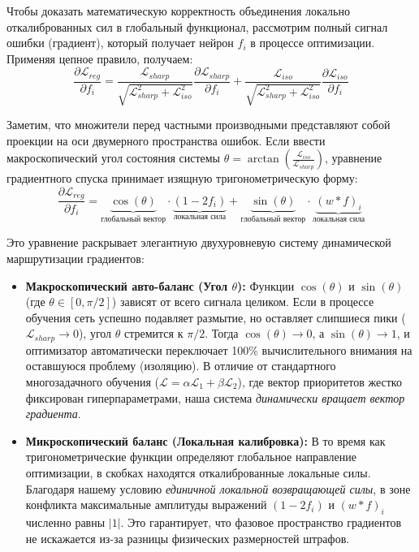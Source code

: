 \documentclass[11pt,a4paper]{article}
\begin{document}
Чтобы доказать математическую корректность объединения локально откалиброванных сил в глобальный функционал, рассмотрим полный сигнал ошибки (градиент), который получает нейрон $f_i$ в процессе оптимизации. Применяя цепное правило, получаем:
\begin{equation}
\frac{\partial \mathcal{L}_{reg}}{\partial f_i} = \frac{\mathcal{L}_{sharp}}{\sqrt{\mathcal{L}_{sharp}^2 + \mathcal{L}_{iso}^2}} \frac{\partial \mathcal{L}_{sharp}}{\partial f_i} + \frac{\mathcal{L}_{iso}}{\sqrt{\mathcal{L}_{sharp}^2 + \mathcal{L}_{iso}^2}} \frac{\partial \mathcal{L}_{iso}}{\partial f_i}
\end{equation}

Заметим, что множители перед частными производными представляют собой проекции на оси двумерного пространства ошибок. Если ввести макроскопический угол состояния системы $\theta = \arctan \left( \frac{\mathcal{L}_{iso}}{\mathcal{L}_{sharp}} \right)$, уравнение градиентного спуска принимает изящную тригонометрическую форму:
\begin{equation}
\frac{\partial \mathcal{L}_{reg}}{\partial f_i} = \underbrace{\cos(\theta)}_{\text{глобальный вектор}} \cdot \underbrace{(1 - 2f_i)}_{\text{локальная сила}} + \underbrace{\sin(\theta)}_{\text{глобальный вектор}} \cdot \underbrace{(w*f)_i}_{\text{локальная сила}}
\end{equation}

Это уравнение раскрывает элегантную двухуровневую систему динамической маршрутизации градиентов:
\begin{itemize}
    \item \textbf{Макроскопический авто-баланс (Угол $\theta$):} Функции $\cos(\theta)$ и $\sin(\theta)$ (где $\theta \in [0, \pi/2]$) зависят от всего сигнала целиком. Если в процессе обучения сеть успешно подавляет размытие, но оставляет слипшиеся пики ($\mathcal{L}_{sharp} \to 0$), угол $\theta$ стремится к $\pi/2$. Тогда $\cos(\theta) \to 0$, а $\sin(\theta) \to 1$, и оптимизатор автоматически переключает 100\% вычислительного внимания на оставшуюся проблему (изоляцию). В отличие от стандартного многозадачного обучения ($\mathcal{L} = \alpha \mathcal{L}_1 + \beta \mathcal{L}_2$), где вектор приоритетов жестко фиксирован гиперпараметрами, наша система \textit{динамически вращает вектор градиента}.
    \item \textbf{Микроскопический баланс (Локальная калибровка):} В то время как тригонометрические функции определяют глобальное направление оптимизации, в скобках находятся откалиброванные локальные силы. Благодаря нашему условию \textit{единичной локальной возвращающей силы}, в зоне конфликта максимальные амплитуды выражений $(1 - 2f_i)$ и $(w*f)_i$ численно равны $|1|$. Это гарантирует, что фазовое пространство градиентов не искажается из-за разницы физических размерностей штрафов.
\end{itemize}
\end{document}
